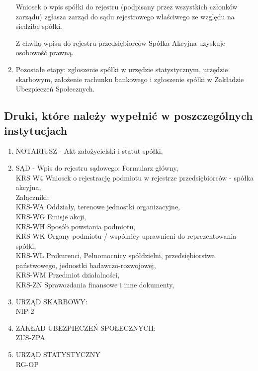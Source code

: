 \documentclass[a4paper, 11pt]{article}
\begin{document}
\begin{enumerate}
Wniosek o wpis spółki do rejestru (podpisany przez wszystkich członków zarządu) zgłasza zarząd do sądu rejestrowego właściwego ze względu na siedzibę spółki.
 
Z chwilą wpisu do rejestru przedsiębiorców Spółka Akcyjna uzyskuje osobowość prawną.

\item Pozostałe etapy:
zgłoszenie spółki w urzędzie statystycznym,
urzędzie skarbowym,
założenie rachunku bankowego i zgłoszenie spółki w Zakładzie Ubezpieczeń Społecznych.

\end{enumerate}

\subsection{Druki, które należy wypełnić w poszczególnych instytucjach}
\begin{enumerate}
\item NOTARIUSZ - Akt założycielski i statut spółki,
	
\item SĄD - Wpis do rejestru sądowego: 
Formularz główny,\\
KRS W4 	Wniosek o rejestrację podmiotu w rejestrze przedsiębiorców - spółka akcyjna,\\
Załączniki:\\
KRS-WA Oddziały, terenowe jednostki organizacyjne,\\
KRS-WG Emisje akcji,\\
KRS-WH Sposób powstania podmiotu,\\
KRS-WK Organy podmiotu / wspólnicy uprawnieni do reprezentowania spółki,\\
KRS-WL Prokurenci, Pełnomocnicy spółdzielni, przedsiębiorstwa państwowego, jednostki badawczo-rozwojowej,\\
KRS-WM Przedmiot działalności,\\
KRS-ZN Sprawozdania finansowe i inne dokumenty,\\

\item URZĄD SKARBOWY:\\
	NIP-2
\item ZAKŁAD UBEZPIECZEŃ SPOŁECZNYCH:\\
	ZUS-ZPA
\item URZĄD STATYSTYCZNY\\
	RG-OP
\end{enumerate}
\end{document}
